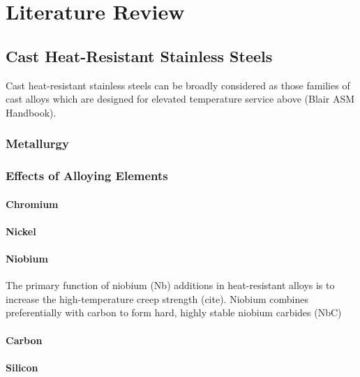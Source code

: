 \chapter{Literature Review} \label{ch:literature-review}

\section{Cast Heat-Resistant Stainless Steels}
Cast heat-resistant stainless steels can be broadly considered as those families of cast  alloys which are designed for elevated temperature service above  (Blair ASM Handbook). 

\subsection{Metallurgy}
\subsection{Effects of Alloying Elements}
\subsubsection{Chromium}
\subsubsection{Nickel}
\subsubsection{Niobium}
The primary function of niobium (Nb) additions in heat-resistant alloys is to increase the high-temperature creep strength (cite). Niobium combines preferentially with carbon to form hard, highly stable niobium carbides (NbC)
\subsubsection{Carbon}
\subsubsection{Silicon}





